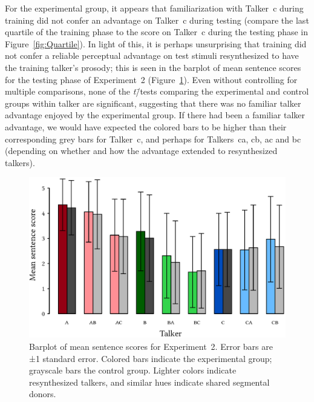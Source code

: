 For the experimental group, it appears that familiarization with Talker~\ac{c} during training did not confer an advantage on Talker~\ac{c} during testing (compare the last quartile of the training phase to the score on Talker~\ac{c} during the testing phase in Figure~\ref{fig:Quartile}).  %
In light of this, it is perhaps unsurprising that training did not confer a reliable perceptual advantage on test stimuli resynthesized to have the training talker’s prosody; this is seen in the barplot of mean sentence scores for the testing phase of Experiment~2 (Figure~\ref{fig:ExpTwoBarplot}).  Even without controlling for multiple comparisons, none of the \textit{t}\=/tests comparing the experimental and control groups within talker are significant, suggesting that there was no familiar talker advantage enjoyed by the experimental group.  If there had been a familiar talker advantage, we would have expected the colored bars to be higher than their corresponding grey bars for Talker~\ac{c}, and perhaps for Talkers~\ac{ca}, \ac{cb}, \ac{ac} and \ac{bc} (depending on whether and how the advantage extended to resynthesized talkers).

\begin{figure}[bt]
	\begin{centering}
	\includegraphics{figures/results/ExpTwoBarplot.eps}
	\caption[Barplot of mean sentence scores for Experiment~2]{Barplot of mean sentence scores for Experiment~2.  Error bars are ±1 standard error.  Colored bars indicate the experimental group; grayscale bars the control group.  Lighter colors indicate resynthesized talkers, and similar hues indicate shared segmental donors.\label{fig:ExpTwoBarplot}}
	\end{centering}
\end{figure}

